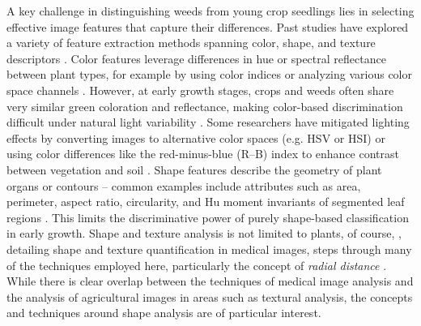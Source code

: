 \documentclass[letterpaper, notitlepage]{report}
\begin{document}
A key challenge in distinguishing weeds from young crop seedlings lies in selecting effective image features that capture their differences. Past studies have explored a variety of feature extraction methods spanning color, shape, and texture descriptors \parencite{Garibaldi-Marquez2022-yn}. Color features leverage differences in hue or spectral reflectance between plant types, for example by using color indices or analyzing various color space channels \parencite{Wu2021-gt}. However, at early growth stages, crops and weeds often share very similar green coloration and reflectance, making color-based discrimination difficult under natural light variability \parencite{Garibaldi-Marquez2022-yn}. Some researchers have mitigated lighting effects by converting images to alternative color spaces (e.g. HSV or HSI) or using color differences like the red-minus-blue (R–B) index to enhance contrast between vegetation and soil \parencite{Wu2021-gt}. Shape features describe the geometry of plant organs or contours – common examples include attributes such as area, perimeter, aspect ratio, circularity, and Hu moment invariants of segmented leaf regions \parencite{Garibaldi-Marquez2022-yn}. This limits the discriminative power of purely shape-based classification in early growth. Shape and texture analysis is not limited to plants, of course, \citeauthor{Bankman2009-wq}, detailing shape and texture quantification in medical images, steps through many of the techniques employed here, particularly the concept of \textit{radial distance} \parencite{Bankman2009-wq}. While there is clear overlap between the techniques of medical image analysis and the analysis of agricultural images in areas such as textural analysis, the concepts and techniques around shape analysis are of particular interest.
\end{document}
